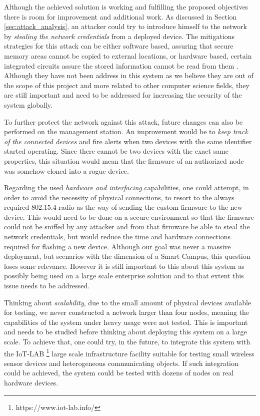 Although the achieved solution is working and fulfilling the proposed objectives there is room for improvement and additional work. As discussed in Section \ref{sec:attack_analysis}, an attacker could try to introduce himself to the network by \emph{stealing the network credentials} from a deployed device. The mitigations strategies for this attack can be either software based,  assuring that secure memory areas cannot be copied to external locations, or hardware based, certain integrated circuits assure the stored information cannot be read from them \cite{Lesjak2014}. Although they have not been address in this system as we believe they are out of the scope of this project and more related to other computer science fields, they are still important and need to be addressed for increasing the security of the system globally.\par 
To further protect the network against this attack, future changes can also be performed on the management station. An improvement would be to \emph{keep track of the connected devices} and fire alerts when two devices with the same identifier started operating. Since there cannot be two devices with the exact same properties, this situation would mean that the firmware of an authorized node was somehow cloned into a rogue device.\par
Regarding the used \emph{hardware and interfacing} capabilities, one could attempt, in order to avoid the necessity of physical connections, to resort to the always required 802.15.4 radio as the way of sending the custom firmware to the new device. This would need to be done on a secure environment so that the firmware could not be sniffed by any attacker and from that firmware be able to steal the network credentials, but would reduce the time and hardware connections required for flashing a new device. Although our goal was never a massive deployment, but scenarios with the dimension of a Smart Campus, this question loses some relevance. However it is still important to this about this system as possibly being used on a large scale enterprise solution and to that extent this issue needs to be addressed.\par
Thinking about \emph{scalability}, due to the small amount of physical devices available for testing, we never constructed a network larger than four nodes, meaning the capabilities of the system under heavy usage were not tested. This is important and needs to be studied before thinking about deploying this system on a large scale. To achieve that, one could try, in the future, to integrate this system with the IoT-LAB \footnote{https://www.iot-lab.info/} large scale infrastructure facility suitable for testing small wireless sensor devices and heterogeneous communicating objects. If such integration could be achieved, the system could be tested with dozens of nodes on real hardware devices.


